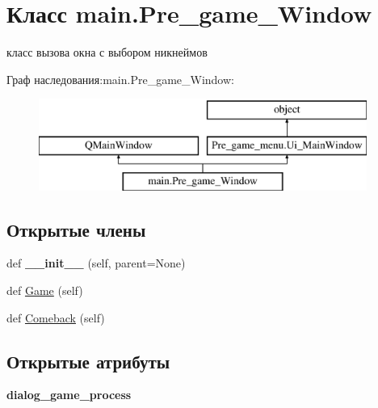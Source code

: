 \hypertarget{classmain_1_1_pre__game___window}{}\section{Класс main.\+Pre\+\_\+game\+\_\+\+Window}
\label{classmain_1_1_pre__game___window}


класс вызова окна с выбором никнеймов  


Граф наследования\+:main.\+Pre\+\_\+game\+\_\+\+Window\+:\begin{figure}[H]
\begin{center}
\leavevmode
\includegraphics[height=3.000000cm]{classmain_1_1_pre__game___window}
\end{center}
\end{figure}
\subsection*{Открытые члены}
\begin{DoxyCompactItemize}
\item 
\mbox{\label{classmain_1_1_pre__game___window_a36aa8d910e57f46002bdf749b4290f91}} 
def {\bfseries \+\_\+\+\_\+init\+\_\+\+\_\+} (self, parent=None)
\item 
def \mbox{\hyperlink{classmain_1_1_pre__game___window_a089a4d758503837996424fb9a49518c8}{Game}} (self)
\item 
def \mbox{\hyperlink{classmain_1_1_pre__game___window_a8936d10f0ec432afcffe29f114de465d}{Comeback}} (self)
\end{DoxyCompactItemize}
\subsection*{Открытые атрибуты}
\begin{DoxyCompactItemize}
\item 
\mbox{\label{classmain_1_1_pre__game___window_aa6d2a2a2df3d681d21d4282f7f49f7bb}} 
{\bfseries dialog\+\_\+game\+\_\+process}
\end{DoxyCompactItemize}


